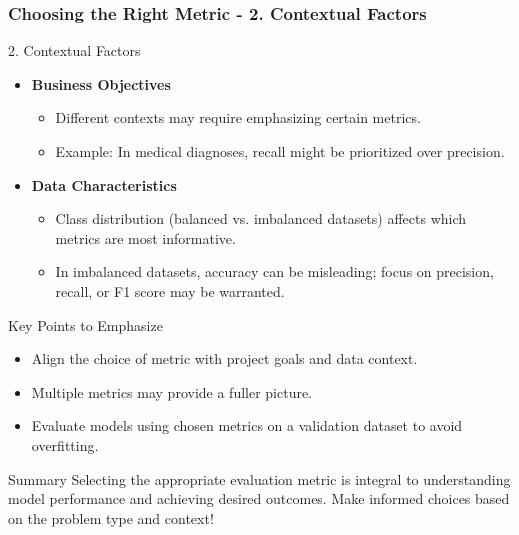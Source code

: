 \documentclass{beamer}
\begin{document}
\begin{frame}[fragile]
    \frametitle{Choosing the Right Metric - 2. Contextual Factors}
    \begin{block}{2. Contextual Factors}
        \begin{itemize}
            \item \textbf{Business Objectives}
            \begin{itemize}
                \item Different contexts may require emphasizing certain metrics. 
                \item Example: In medical diagnoses, recall might be prioritized over precision.
            \end{itemize}
            
            \item \textbf{Data Characteristics}
            \begin{itemize}
                \item Class distribution (balanced vs. imbalanced datasets) affects which metrics are most informative.
                \item In imbalanced datasets, accuracy can be misleading; focus on precision, recall, or F1 score may be warranted.
            \end{itemize}
        \end{itemize}
    \end{block}

    \begin{block}{Key Points to Emphasize}
        \begin{itemize}
            \item Align the choice of metric with project goals and data context.
            \item Multiple metrics may provide a fuller picture.
            \item Evaluate models using chosen metrics on a validation dataset to avoid overfitting.
        \end{itemize}
    \end{block}
    
    \begin{block}{Summary}
        Selecting the appropriate evaluation metric is integral to understanding model performance and achieving desired outcomes. Make informed choices based on the problem type and context!
    \end{block}
\end{frame}
\end{document}
